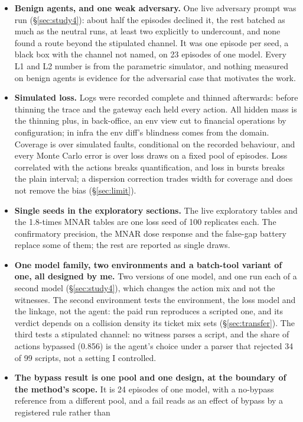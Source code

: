 \documentclass[11pt]{article}
\begin{document}
\begin{itemize}
\item \textbf{Benign agents, and one weak adversary.} One live adversary prompt was run
(\S\ref{sec:study4}): about half the episodes declined it, the rest batched as much as the
neutral runs, at least two explicitly to undercount, and none found a route beyond the
stipulated channel. It was one episode per seed, a black box with the channel not named, on
23 episodes of one model. Every L1 and L2 number is from the parametric simulator, and
nothing measured on benign agents is evidence for the adversarial case that motivates the
work.
\item \textbf{Simulated loss.} Logs were recorded complete and thinned afterwards:
before thinning the trace and the gateway each held every action. All hidden mass
is the thinning plus, in back-office, an env view cut to financial operations by
configuration; in infra the env diff's blindness comes from the domain. Coverage is over simulated faults, conditional on the recorded
behaviour, and every Monte Carlo error is over loss draws on a fixed pool of
episodes. Loss correlated with the actions breaks quantification, and loss in
bursts breaks the plain interval; a dispersion correction trades width for
coverage and does not remove the bias (\S\ref{sec:limit}).
\item \textbf{Single seeds in the exploratory sections.} The live exploratory
tables and the 1.8-times MNAR tables are one loss seed of 100 replicates each.
The confirmatory precision, the MNAR dose response and the false-gap battery
replace some of them; the rest are reported as single draws.
\item \textbf{One model family, two environments and a batch-tool variant of one, all
designed by me.} Two versions of one model, and one run each of a second model
(\S\ref{sec:study4}), which changes the action mix and not the witnesses. The second environment tests the environment, the loss model and the
linkage, not the agent: the paid run reproduces a scripted one, and its verdict
depends on a collision density its ticket mix sets (\S\ref{sec:transfer}).
The third tests a stipulated channel: no witness parses a script, and the share
of actions bypassed (0.856) is the agent's choice under a parser that rejected 34 of 99
scripts, not a setting I controlled.
\item \textbf{The bypass result is one pool and one design, at the boundary of the
method's scope.} It is 24 episodes of one model, with a no-bypass reference from a
different pool, and a fail reads as an effect of bypass by a registered rule rather than

\end{itemize}
\end{document}
